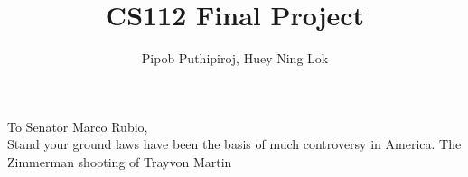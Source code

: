 \documentclass[11pt]{article}
\begin{document}
\title{CS112 Final Project}
\author{Pipob Puthipiroj, Huey Ning Lok}
\maketitle

To Senator Marco Rubio,\\

Stand your ground laws have been the basis of much controversy in America. The Zimmerman shooting of Trayvon Martin\\

	



 
\end{document}
